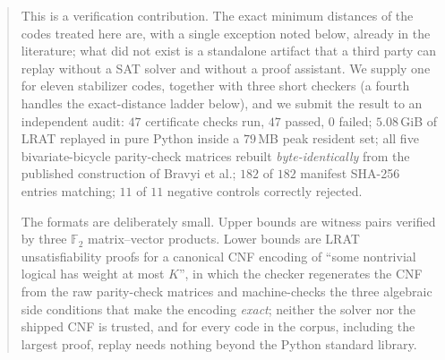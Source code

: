 \documentclass[11pt]{amsart}
\newcommand{\FF}{\mathbb{F}_{2}}
\theoremstyle{plain}
\theoremstyle{definition}
\theoremstyle{remark}
\begin{document}

\date{August 6, 2026}

\begin{abstract}
This is a verification contribution. The exact minimum distances of the codes
treated here are, with a single exception noted below, already in the
literature; what did not exist is a standalone artifact that a third party can
replay without a SAT solver and without a proof assistant. We supply one for
eleven stabilizer codes, together with three short checkers (a fourth handles
the exact-distance ladder below), and we submit the result to an independent
audit:
$47$ certificate checks run, $47$ passed, $0$ failed; $5.08$\,GiB of LRAT
replayed in pure Python inside a $79$\,MB peak resident set; all five
bivariate-bicycle parity-check matrices rebuilt \emph{byte-identically} from
the published construction of Bravyi et al.; $182$ of $182$ manifest SHA-256
entries matching; $11$ of $11$ negative controls correctly rejected.

The formats are deliberately small. Upper bounds are witness pairs verified by
three $\FF$ matrix--vector products. Lower bounds are LRAT unsatisfiability
proofs for a canonical CNF encoding of ``some nontrivial logical has weight at
most $K$'', in which the checker regenerates the CNF from the raw parity-check
matrices and machine-checks the three algebraic side conditions that make the
encoding \emph{exact}; neither the solver nor the shipped CNF is trusted, and
for every code in the corpus, including the largest proof, replay needs
nothing beyond the Python standard library.


\end{abstract}
\end{document}
